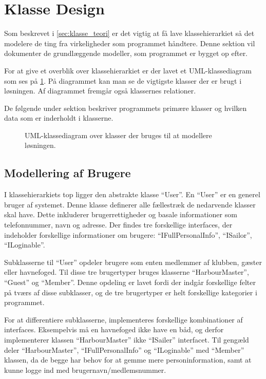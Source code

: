 \section{Klasse Design}
\label{sec:klasse_design}
Som beskrevet i \cref{sec:klasse_teori} er det vigtig at få lave klassehierarkiet så det modelere de ting fra virkeligheder som programmet håndtere. Denne sektion vil dokumenter de grundlæggende modeller, som programmet er bygget op efter. 

For at give et overblik over klassehierarkiet er der lavet et UML-klassediagram som ses på \cref{fig:UML}. På diagrammet kan man se de vigtigste klasser der er brugt i løsningen. Af diagrammet fremgår også klassernes relationer.

De følgende under sektion beskriver programmets primære klasser og hvilken data som er inderholdt i klasserne.


\begin{figure}
  \centering
  \vspace*{-4.5cm}
 	\caption{UML-klassediagram over klasser der bruges til at modellere løsningen.} \label{fig:UML}  
 \end{figure}


\subsection{Modellering af Brugere}
\label{sub:brugere_af_programmet}

I klassehierarkiets top ligger den abstrakte klasse \enquote{User}. En \enquote{User} er en generel bruger af systemet. Denne klasse definerer alle fællestræk de nedarvende klasser skal have. Dette inkluderer brugerrettigheder og basale informationer som telefonnummer, navn og adresse. Der findes tre forskellige interfaces, der indeholder forskellige informationer om brugere: \enquote{IFullPersonalInfo}, \enquote{ISailor}, \enquote{ILoginable}.

Subklasserne til \enquote{User} opdeler brugere som enten medlemmer af klubben, gæster eller havnefoged. Til disse tre brugertyper bruges klasserne \enquote{HarbourMaster}, \enquote{Guest} og \enquote{Member}. Denne opdeling er lavet fordi der indgår forskellige felter på tværs af disse subklasser, og de tre brugertyper er helt forskellige kategorier i programmet. 

For at differentiere subklasserne, implementeres forskellige kombinationer af interfaces. Eksempelvis må en havnefoged ikke have en båd, og derfor implementerer klassen \enquote{HarbourMaster} ikke \enquote{ISailer} interfacet. Til gengæld deler \enquote{HarbourMaster}, \enquote{IFullPersonalInfo} og \enquote{ILoginable} med \enquote{Member} klassen, da de begge har behov for at gemme mere personinformation, samt at kunne logge ind med brugernavn/medlemsnummer.
 

